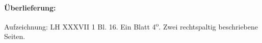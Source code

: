 %
%
%
\begin{ledgroupsized}[r]{120mm}
\footnotesize
\pstart
\noindent\textbf{Überlieferung:}
\pend
\end{ledgroupsized}
\begin{ledgroupsized}[r]{114mm}
\footnotesize
\pstart \parindent -6mm
%
Aufzeichnung: LH XXXVII 1 Bl. 16.
Ein Blatt 4\textsuperscript{o}.
Zwei rechtspaltig beschriebene Seiten.
\pend
\end{ledgroupsized}
%
\vspace*{5mm}
